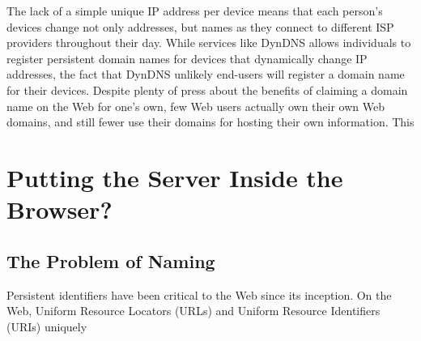 \documentclass{amsart}
\begin{document}
The lack of a simple unique IP address per device means that each person's devices change not only addresses, but names as they connect to different ISP providers throughout their day.  While services like DynDNS allows individuals to register persistent domain names for devices that dynamically change IP addresses, the fact that DynDNS unlikely end-users will register a domain name for their devices.  Despite plenty of press about the benefits of claiming a domain name on the Web for one's own, few Web users actually own their own Web domains, and still fewer use their domains for hosting their own information.  This 

\section{Putting the Server Inside the Browser?}


\subsection{The Problem of Naming}

Persistent identifiers have been critical to the Web since its inception.  On the Web, Uniform Resource Locators (URLs) and Uniform Resource Identifiers (URIs) uniquely 







\end{document}
